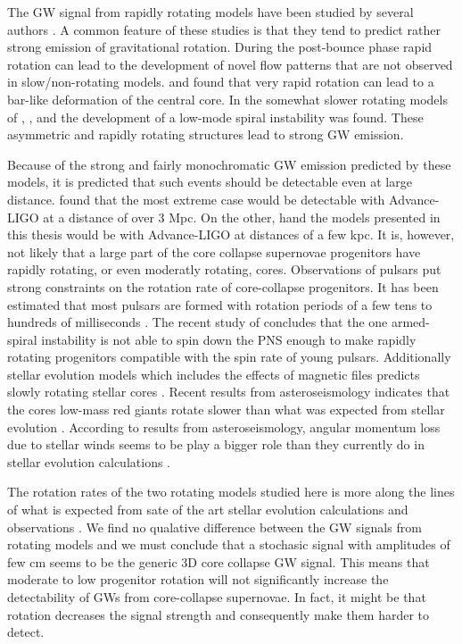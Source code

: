 The GW signal from rapidly rotating models have been studied 
by several authors \citep{mueller_82,rampp_98,shibata_05,ott_05,scheidegger_10,kuroda_14,takiwaki_16}. 
A common feature of these studies is that they tend to predict rather strong emission of
gravitational rotation. During the post-bounce phase rapid rotation can lead to the
development of novel flow patterns that are not observed in slow/non-rotating models.
\cite{rampp_98} and \cite{shibata_05} found that very rapid rotation can
lead to a bar-like deformation of the central core. In the somewhat slower 
rotating models of \cite{ott_05}, \cite{kuroda_14}, and \cite{takiwaki_16} the development of
a low-mode spiral instability was found. These asymmetric and rapidly rotating structures
lead to strong GW emission. 

Because of the strong and fairly monochromatic GW emission predicted by these models,
it is predicted that such events should be detectable even at large distance. \citep{gossan_15} found that the
most extreme case would be detectable with Advance-LIGO at a distance of over 3 Mpc. On the other, hand
the models presented in this thesis would be with Advance-LIGO at distances of a few kpc. 
It is, however, not likely that a large part of the core collapse supernovae progenitors
have rapidly rotating, or even moderatly rotating, cores. Observations of pulsars put
strong constraints on the rotation rate of core-collapse progenitors. It has been estimated that
most pulsars are formed with rotation periods of a few tens to hundreds of milliseconds \citep{vranesevic_04,popov_12,noutsos_13}.
The recent study of \cite{kazeroni_17} concludes that
the one armed-spiral instability \citep{ott_05,kuroda_14,takiwaki_16} is not able to spin 
down the PNS enough to make rapidly rotating progenitors compatible with the spin rate of young
pulsars. Additionally stellar evolution models which includes the effects of magnetic files predicts
slowly rotating stellar cores \citep{heger_05}. Recent results from asteroseismology \cite{beck_12,mosser_12} indicates
that the cores low-mass red giants rotate slower than what was expected from stellar evolution \citep{cantiello_14,deheuvels_14}.
According to results from asteroseismology, angular momentum loss due to stellar winds seems to be play a bigger role than they currently 
do in stellar evolution calculations \citep{cantiello_14}. 

The rotation rates of the two rotating models studied here is more along the lines of what 
is expected from sate of the art stellar evolution calculations \citep{heger_05} and observations 
\citep{beck_12,mosser_12,popov_12,noutsos_13,cantiello_14,deheuvels_14}. 
We find no qualative difference between the GW signals from rotating models and we must conclude that
a stochasic signal with amplitudes of few cm seems to be the generic 3D core collapse GW signal.
This means that moderate to low progenitor rotation will not significantly increase the detectability of 
GWs from core-collapse supernovae. In fact, it might be that rotation decreases the signal strength and 
consequently make them harder to detect. 

